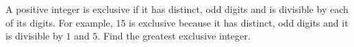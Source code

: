 A positive integer is exclusive if it has distinct, odd digits and is divisible by each of its digits. For example, $15$ is exclusive because it has distinct, odd digits and it is divisible by $1$ and $5$. Find the greatest exclusive integer.
